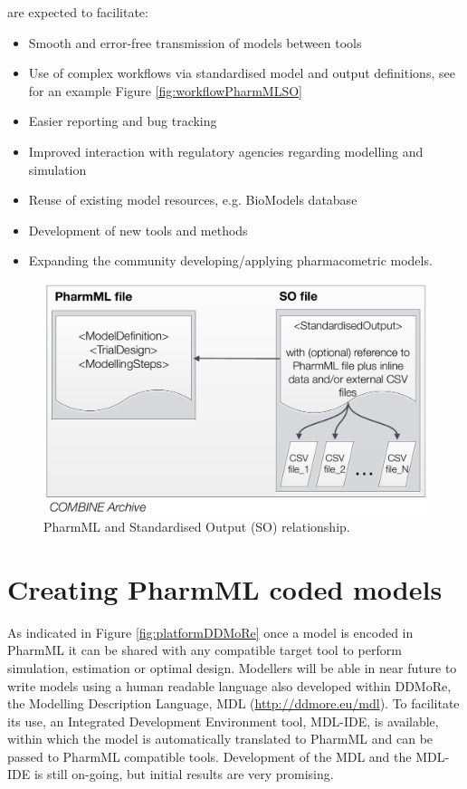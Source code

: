 are expected to facilitate:
\begin{itemize}
\item
Smooth and error-free transmission of models between tools
\item
Use of complex workflows via standardised model and output definitions, 
see for an example Figure \ref{fig:workflowPharmMLSO}
\item
Easier reporting and bug tracking
\item
Improved interaction with regulatory agencies regarding modelling and simulation
\item
Reuse of existing model resources, e.g. BioModels database
\item
Development of new tools and methods
\item
Expanding the community developing/applying pharmacometric models.
\end{itemize}

\begin{figure}[ht!]
\centering
  \includegraphics[width=0.6\linewidth]{pics/PharmML_SO}
 \caption{PharmML and Standardised Output (SO) relationship.}
 \label{fig:PharmML_SO}
\end{figure}


\section{Creating PharmML coded models}
\label{intro:creatingPharmML}

As indicated in Figure \ref{fig:platformDDMoRe} once a model is encoded 
in PharmML it can be shared with any compatible target tool to perform simulation, 
estimation or optimal design. Modellers will be able in near future to write models 
using a human readable language also developed within DDMoRe, the 
Modelling Description Language, MDL (\url{http://ddmore.eu/mdl}). To facilitate its use, 
an Integrated Development Environment tool, MDL-IDE, is available, within which 
the model is automatically translated to PharmML and can be passed to PharmML 
compatible tools. Development of the MDL and the MDL-IDE is still on-going, 
but initial results are very promising. 


